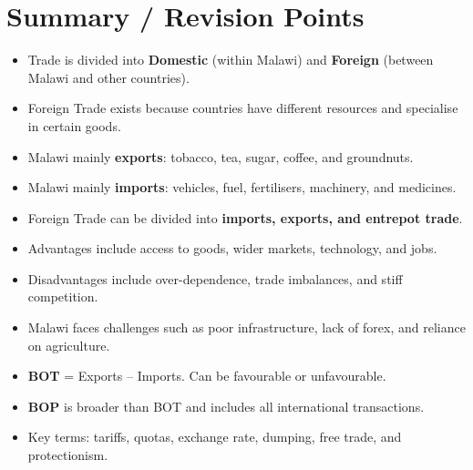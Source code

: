\documentclass[14pt,a4paper, openany]{book}
\begin{document}
\section*{Summary / Revision Points}
\begin{itemize}
	\item Trade is divided into \textbf{Domestic} (within Malawi) and \textbf{Foreign} (between Malawi and other countries).
	\item Foreign Trade exists because countries have different resources and specialise in certain goods.
	\item Malawi mainly \textbf{exports}: tobacco, tea, sugar, coffee, and groundnuts.
	\item Malawi mainly \textbf{imports}: vehicles, fuel, fertilisers, machinery, and medicines.
	\item Foreign Trade can be divided into \textbf{imports, exports, and entrepot trade}.
	\item Advantages include access to goods, wider markets, technology, and jobs.
	\item Disadvantages include over-dependence, trade imbalances, and stiff competition.
	\item Malawi faces challenges such as poor infrastructure, lack of forex, and reliance on agriculture.
	\item \textbf{BOT} = Exports – Imports. Can be favourable or unfavourable.
	\item \textbf{BOP} is broader than BOT and includes all international transactions.
	\item Key terms: tariffs, quotas, exchange rate, dumping, free trade, and protectionism.
\end{itemize}



\backmatter

\nocite{*}
\printbibliography{}
\end{document}
